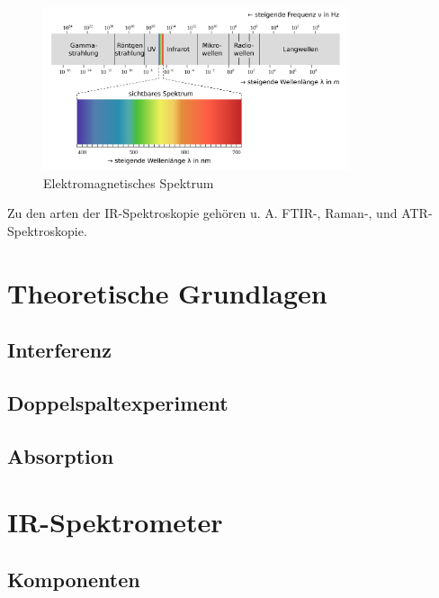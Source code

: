 \documentclass{article}
\begin{document}
\begin{figure}[H]
    \centering
    \includegraphics[width=0.8\textwidth]{em_spektrum.png}
    \caption{Elektromagnetisches Spektrum}
    \label{fig:em-spektrum}
\end{figure}

Zu den arten der IR-Spektroskopie gehören u. A. FTIR-, Raman-, und ATR-Spektroskopie.

\newpage
\section{Theoretische Grundlagen}


\subsection{Interferenz}


\subsection{Doppelspaltexperiment}


\subsection{Absorption}


\section{IR-Spektrometer}


\subsection{Komponenten}
\end{document}
